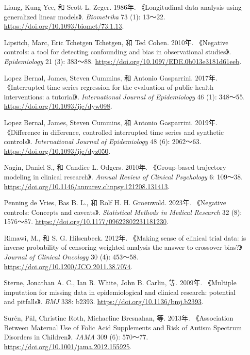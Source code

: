 \documentclass[
  chinese-hans,
  letterpaper,
  DIV=11,
  numbers=noendperiod]{scrreprt}
\newlength{\cslhangindent}
\newenvironment{CSLReferences}[2] %
 {\begin{list}{}{%
  \setlength{\itemindent}{0pt}
  \setlength{\leftmargin}{0pt}
  \setlength{\parsep}{0pt}
  \ifodd #1
   \setlength{\leftmargin}{\cslhangindent}
   \setlength{\itemindent}{-1\cslhangindent}
  \fi
  \setlength{\itemsep}{#2\baselineskip}}}
 {\end{list}}
\begin{document}
\begin{CSLReferences}{1}{1}
Liang, Kung-Yee, 和 Scott L. Zeger. 1986年. {《Longitudinal data
analysis using generalized linear models》}. \emph{Biometrika} 73 (1):
13～22. \url{https://doi.org/10.1093/biomet/73.1.13}.

Lipsitch, Marc, Eric Tchetgen Tchetgen, 和 Ted Cohen. 2010年.
{《Negative controls: a tool for detecting confounding and bias in
observational studies》}. \emph{Epidemiology} 21 (3): 383～88.
\url{https://doi.org/10.1097/EDE.0b013e3181d61eeb}.

Lopez Bernal, James, Steven Cummins, 和 Antonio Gasparrini. 2017年.
{《Interrupted time series regression for the evaluation of public
health interventions: a tutorial》}. \emph{International Journal of
Epidemiology} 46 (1): 348～55. \url{https://doi.org/10.1093/ije/dyw098}.

Lopez Bernal, James, Steven Cummins, 和 Antonio Gasparrini. 2019年.
{《Difference in difference, controlled interrupted time series and
synthetic controls》}. \emph{International Journal of Epidemiology} 48
(6): 2062～63. \url{https://doi.org/10.1093/ije/dyz050}.

Nagin, Daniel S., 和 Candice L. Odgers. 2010年. {《Group-based
trajectory modeling in clinical research》}. \emph{Annual Review of
Clinical Psychology} 6: 109～38.
\url{https://doi.org/10.1146/annurev.clinpsy.121208.131413}.

Penning de Vries, Bas B. L., 和 Rolf H. H. Groenwold. 2023年.
{《Negative controls: Concepts and caveats》}. \emph{Statistical Methods
in Medical Research} 32 (8): 1576～87.
\url{https://doi.org/10.1177/09622802231181230}.

Rimawi, M., 和 S. G. Hilsenbeck. 2012年. {《Making sense of clinical
trial data: is inverse probability of censoring weighted analysis the
answer to crossover bias?》} \emph{Journal of Clinical Oncology} 30 (4):
453～58. \url{https://doi.org/10.1200/JCO.2011.38.7074}.

Sterne, Jonathan A. C., Ian R. White, John B. Carlin, 等. 2009年.
{《Multiple imputation for missing data in epidemiological and clinical
research: potential and pitfalls》}. \emph{BMJ} 338: b2393.
\url{https://doi.org/10.1136/bmj.b2393}.

Surén, Pål, Christine Roth, Michaeline Bresnahan, 等. 2013年.
{《Association Between Maternal Use of Folic Acid Supplements and Risk
of Autism Spectrum Disorders in Children》}. \emph{JAMA} 309 (6):
570～77. \url{https://doi.org/10.1001/jama.2012.155925}.


\end{CSLReferences}
\end{document}
